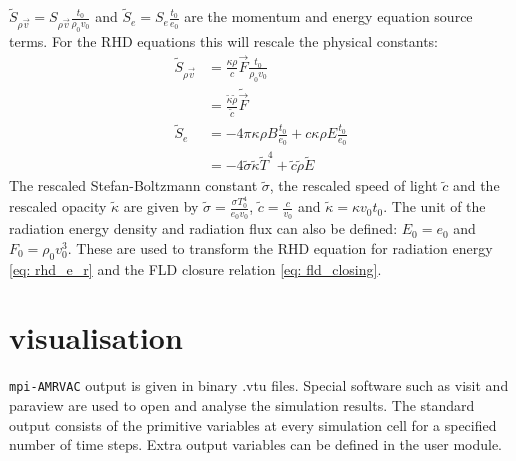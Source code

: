 $\tilde{S}_{\rho \vec{v}} = S_{\rho \vec{v}} \frac{t_0}{\rho_0 v_0}$ and $\tilde{S}_e = S_e \frac{t_0}{e_0}$ are the momentum and energy equation source terms. For the RHD equations this will rescale the physical constants:
\begin{align}
	\tilde{S}_{\rho \vec{v}} &=  \frac{\kappa \rho}{c} \vec{F} \frac{t_0}{\rho_0 v_0} \\
							 &=  \frac{\tilde{\kappa}\tilde{\rho}}{\tilde{c}} \tilde{\vec{F}} \\
	\tilde{S}_e &= -4\pi \kappa\rho B \frac{t_0}{e_0}  + c \kappa \rho E \frac{t_0}{e_0} \\
				&= -4 \tilde{\sigma} \tilde{\kappa} \tilde{T}^4 + \tilde{c} \tilde{\rho} \tilde{E}
\end{align}
The rescaled Stefan-Boltzmann constant $\tilde{\sigma}$, the rescaled speed of light $\tilde{c}$ and the rescaled opacity $\tilde{\kappa}$ are given by $\tilde{\sigma} = \frac{\sigma T_0^4}{e_0 v_0}$, $\tilde{c} = \frac{c}{v_0}$ and $\tilde{\kappa} = \kappa v_0 t_0$. The unit of the radiation energy density and radiation flux can also be defined: $E_0 = e_0$ and $F_0 = \rho_0 v_0^3$. These are used to transform the RHD equation for radiation energy \eqref{eq: rhd_e_r} and the FLD closure relation \eqref{eq: fld_closing}. 

\section{visualisation}
\texttt{mpi-AMRVAC} output is given in binary .vtu files. Special software such as visit \cite{} and paraview are used to open and analyse the simulation results. The standard output consists of the primitive variables at every simulation cell for a specified number of time steps. Extra output variables can be defined in the user module.

